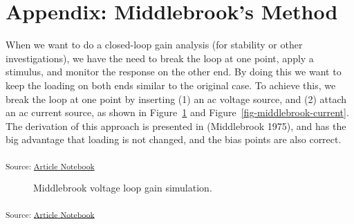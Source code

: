 \documentclass[
  a4paper,
  DIV=11,
  numbers=noendperiod]{scrartcl}
\begin{document}
\section{Appendix: Middlebrook's Method}\label{sec-middlebrook-method}

When we want to do a closed-loop gain analysis (for stability or other
investigations), we have the need to break the loop at one point, apply
a stimulus, and monitor the response on the other end. By doing this we
want to keep the loading on both ends similar to the original case. To
achieve this, we break the loop at one point by inserting (1) an ac
voltage source, and (2) attach an ac current source, as shown in
Figure~\ref{fig-middlebrook-voltage} and
Figure~\ref{fig-middlebrook-current}. The derivation of this approach is
presented in (Middlebrook 1975), and has the big advantage that loading
is not changed, and the bias points are also correct.

\textsubscript{Source:
\href{https://iic-jku.github.io/analog-circuit-design/index.qmd.html}{Article
Notebook}}

\begin{figure}[H]


\caption{\label{fig-middlebrook-voltage}Middlebrook voltage loop gain
simulation.}

\end{figure}%

\textsubscript{Source:
\href{https://iic-jku.github.io/analog-circuit-design/index.qmd.html}{Article
Notebook}}
\end{document}
